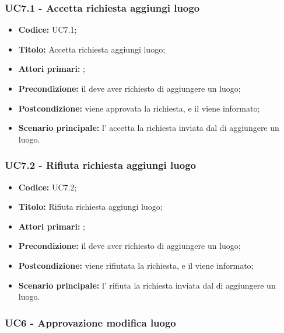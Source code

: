 \documentclass[casi-duso]{subfiles}
\begin{document}
\subsubsection{UC7.1 - Accetta richiesta aggiungi luogo}
\label{subsub:UC7.1}
\begin{itemize}
  \item \textbf{Codice:} UC7.1;
  \item \textbf{Titolo:} Accetta richiesta aggiungi luogo;
  \item \textbf{Attori primari:} ;
  \item \textbf{Precondizione:} il  deve aver richiesto di aggiungere un luogo;
  \item \textbf{Postcondizione:} viene approvata la richiesta, e il  viene informato;
  \item \textbf{Scenario principale:} l' accetta la richiesta inviata dal  di aggiungere un luogo.
\end{itemize}

\subsubsection{UC7.2 - Rifiuta richiesta aggiungi luogo}
\label{subsub:UC7.2}
\begin{itemize}
  \item \textbf{Codice:} UC7.2;
  \item \textbf{Titolo:} Rifiuta richiesta aggiungi luogo;
  \item \textbf{Attori primari:} ;
  \item \textbf{Precondizione:} il  deve aver richiesto di aggiungere un luogo;
  \item \textbf{Postcondizione:} viene rifiutata la richiesta, e il  viene informato;
  \item \textbf{Scenario principale:} l' rifiuta la richiesta inviata dal  di aggiungere un luogo.
\end{itemize}


\subsubsection{UC6 - Approvazione modifica luogo}
\label{subsub:UC6}
\end{document}
